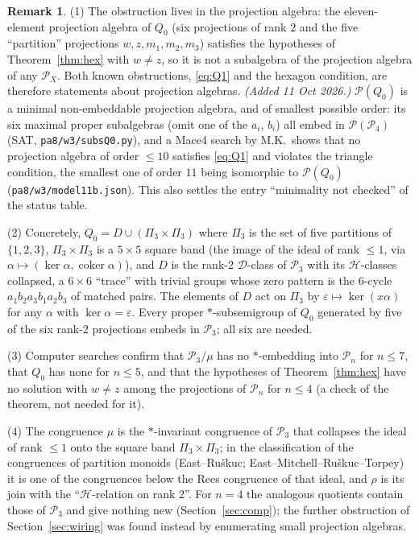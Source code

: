 \documentclass[11pt]{amsart}
\theoremstyle{definition}
\newtheorem{remark}[theorem]{Remark}
\newcommand{\D}{\mathcal{D}}
\newcommand{\Hh}{\mathcal{H}}
\renewcommand{\P}{\mathcal{P}}
\newcommand{\Part}{\Pi}
\begin{document}
\begin{remark}
(1) The obstruction lives in the projection algebra: the eleven-element projection algebra of $Q_0$ (six projections of rank $2$ and the five ``partition'' projections $w,z,m_1,m_2,m_3$) satisfies the hypotheses of Theorem~\ref{thm:hex} with $w\ne z$, so it is not a subalgebra of the projection algebra of any $\P_X$. Both known obstructions, \eqref{eq:Q1} and the hexagon condition, are therefore statements about projection algebras. \emph{(Added 11 Oct 2026.)} $\P(Q_0)$ is a minimal non-embeddable projection algebra, and of smallest possible order: its six maximal proper subalgebras (omit one of the $a_i$, $b_i$) all embed in $\P(\P_4)$ (SAT, \texttt{pa8/w3/subsQ0.py}), and a Mace4 search by M.K.\ shows that no projection algebra of order $\le10$ satisfies \eqref{eq:Q1} and violates the triangle condition, the smallest one of order $11$ being isomorphic to $\P(Q_0)$ (\texttt{pa8/w3/model11b.json}). This also settles the entry ``minimality not checked'' of the status table.

(2) Concretely, $Q_0=D\cup(\Part_3\times\Part_3)$ where $\Part_3$ is the set of five partitions of $\{1,2,3\}$, $\Part_3\times\Part_3$ is a $5\times5$ square band (the image of the ideal of rank $\le1$, via $\alpha\mapsto(\ker\alpha,\operatorname{coker}\alpha)$), and $D$ is the rank-$2$ $\D$-class of $\P_3$ with its $\Hh$-classes collapsed, a $6\times6$ ``trace'' with trivial groups whose zero pattern is the $6$-cycle $a_1b_2a_3b_1a_2b_3$ of matched pairs. The elements of $D$ act on $\Part_3$ by $\varepsilon\mapsto\ker(x\alpha)$ for any $\alpha$ with $\ker\alpha=\varepsilon$. Every proper $*$-subsemigroup of $Q_0$ generated by five of the six rank-$2$ projections embeds in $\P_3$; all six are needed.

(3) Computer searches confirm that $\P_3/\mu$ has no $*$-embedding into $\P_n$ for $n\le7$, that $Q_0$ has none for $n\le5$, and that the hypotheses of Theorem~\ref{thm:hex} have no solution with $w\ne z$ among the projections of $\P_n$ for $n\le4$ (a check of the theorem, not needed for it).

(4) The congruence $\mu$ is the $*$-invariant congruence of $\P_3$ that collapses the ideal of rank $\le1$ onto the square band $\Part_3\times\Part_3$; in the classification of the congruences of partition monoids (East--Ruškuc; East--Mitchell--Ruškuc--Torpey) it is one of the congruences below the Rees congruence of that ideal, and $\rho$ is its join with the ``$\Hh$-relation on rank $2$''. For $n=4$ the analogous quotients contain those of $\P_3$ and give nothing new (Section~\ref{sec:comp}); the further obstruction of Section~\ref{sec:wiring} was found instead by enumerating small projection algebras.
\end{remark}
\end{document}
